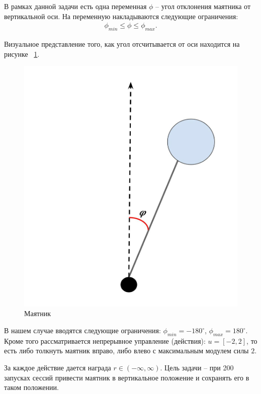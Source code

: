 В рамках данной задачи есть одна переменная $\phi$ -- угол отклонения маятника от вертикальной оси. На переменную накладываются следующие ограничения:
\begin{equation}
	\begin{aligned}
		\phi_{min} \leq \phi \leq \phi_{max}.
	\end{aligned}
\end{equation}

Визуальное представление того, как угол отсчитывается от оси находится на рисунке ~\ref{fig:pend2}.

\begin{figure}[h]
	\centering
	\includegraphics[scale=0.3]{pend2.jpg}
	\caption {Маятник}
	\label{fig:pend2}
\end{figure}

В нашем случае вводятся следующие ограничения:
$\phi_{min} = -180^\circ$,  $\phi_{max} = 180^\circ$. 
Кроме того рассматривается непрерывное управление (действия): $u = [-2, 2]$, то есть либо толкнуть маятник вправо, либо влево с максимальным модулем силы $2$.

За каждое действие дается награда $r \in (-\infty, \infty)$. Цель задачи -- при 200 запусках сессий  привести маятник в вертикальное положение и сохранять его в таком положении. 

